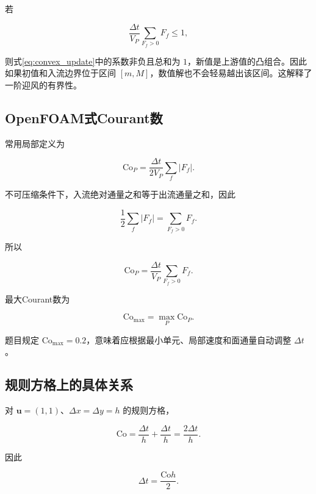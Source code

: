 \documentclass[UTF8,12pt,a4paper,fontset=fandol]{ctexart}
\numberwithin{equation}{section}
\newcommand{\Co}{\mathrm{Co}}
\newcommand{\Cmax}{\mathrm{Co}_{\max}}
\begin{document}
若

\begin{equation}
  \frac{\Delta t}{V_P}
  \sum_{F_f>0}F_f
  \leq1,
  \label{eq:local_cfl}
\end{equation}

则式\eqref{eq:convex_update}中的系数非负且总和为 $1$，新值是上游值的凸组合。因此如果初值和入流边界位于区间 $[m,M]$，数值解也不会轻易越出该区间。这解释了一阶迎风的有界性。

\subsection{OpenFOAM式Courant数}

常用局部定义为

\begin{equation}
  \Co_P
  =
  \frac{\Delta t}{2V_P}
  \sum_f|F_f|.
\end{equation}

不可压缩条件下，入流绝对通量之和等于出流通量之和，因此

\begin{equation}
  \frac12\sum_f|F_f|
  =
  \sum_{F_f>0}F_f.
\end{equation}

所以

\begin{equation}
  \Co_P
  =
  \frac{\Delta t}{V_P}
  \sum_{F_f>0}F_f.
\end{equation}

最大Courant数为

\begin{equation}
  \Cmax=\max_P\Co_P.
\end{equation}

题目规定 $\Cmax=0.2$，意味着应根据最小单元、局部速度和面通量自动调整 $\Delta t$。

\subsection{规则方格上的具体关系}

对 $\bm u=(1,1)$、$\Delta x=\Delta y=h$ 的规则方格，

\begin{equation}
  \Co
  =
  \frac{\Delta t}{h}
  +
  \frac{\Delta t}{h}
  =
  \frac{2\Delta t}{h}.
\end{equation}

因此

\begin{equation}
  \Delta t
  =
  \frac{\Co h}{2}.
\end{equation}
\end{document}
